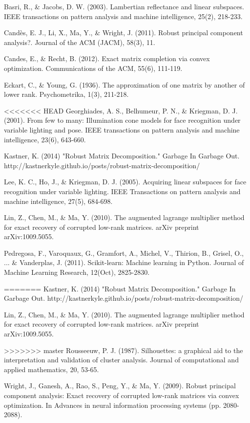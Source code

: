 \documentclass[11pt]{scrartcl} %
\theoremstyle{plain}
\begin{document}
\begin{thebibliography}{9}

 Basri, R., \& Jacobs, D. W. (2003). Lambertian reflectance and linear subspaces. IEEE transactions on pattern analysis and machine intelligence, 25(2), 218-233.

 Candès, E. J., Li, X., Ma, Y., \& Wright, J. (2011). Robust principal component analysis?. Journal of the ACM (JACM), 58(3), 11.

 Candes, E., \& Recht, B. (2012). Exact matrix completion via convex optimization. Communications of the ACM, 55(6), 111-119.

 Eckart, C., \& Young, G. (1936). The approximation of one matrix by another of lower rank. Psychometrika, 1(3), 211-218.

<<<<<<< HEAD
 Georghiades, A. S., Belhumeur, P. N., \& Kriegman, D. J. (2001). From few to many: Illumination cone models for face recognition under variable lighting and pose. IEEE transactions on pattern analysis and machine intelligence, 23(6), 643-660.

 Kastner, K. (2014) "Robust Matrix Decomposition." Garbage In Garbage Out. http://kastnerkyle.github.io/posts/robust-matrix-decomposition/

 Lee, K. C., Ho, J., \& Kriegman, D. J. (2005). Acquiring linear subspaces for face recognition under variable lighting. IEEE Transactions on pattern analysis and machine intelligence, 27(5), 684-698.

 Lin, Z., Chen, M., \& Ma, Y. (2010). The augmented lagrange multiplier method for exact recovery of corrupted low-rank matrices. arXiv preprint arXiv:1009.5055.

 Pedregosa, F., Varoquaux, G., Gramfort, A., Michel, V., Thirion, B., Grisel, O., ... \& Vanderplas, J. (2011). Scikit-learn: Machine learning in Python. Journal of Machine Learning Research, 12(Oct), 2825-2830.

=======
 Kastner, K. (2014) "Robust Matrix Decomposition." Garbage In Garbage Out. http://kastnerkyle.github.io/posts/robust-matrix-decomposition/

 Lin, Z., Chen, M., \& Ma, Y. (2010). The augmented lagrange multiplier method for exact recovery of corrupted low-rank matrices. arXiv preprint arXiv:1009.5055.

>>>>>>> master
 Rousseeuw, P. J. (1987). Silhouettes: a graphical aid to the interpretation and validation of cluster analysis. Journal of computational and applied mathematics, 20, 53-65.

 Wright, J., Ganesh, A., Rao, S., Peng, Y., \& Ma, Y. (2009). Robust principal component analysis: Exact recovery of corrupted low-rank matrices via convex optimization. In Advances in neural information processing systems (pp. 2080-2088).

\end{thebibliography}
\end{document}

